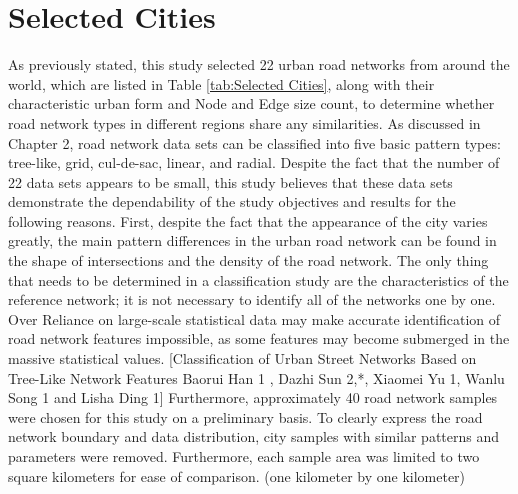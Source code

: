 \section{Selected Cities}
As previously stated, this study selected 22 urban road networks from around the world, which are listed in Table \ref{tab:Selected Cities}, along with their characteristic urban form and Node and Edge size count, to determine whether road network types in different regions share any similarities. As discussed in Chapter 2, road network data sets can be classified into five basic pattern types: tree-like, grid, cul-de-sac, linear, and radial. Despite the fact that the number of 22 data sets appears to be small, this study believes that these data sets demonstrate the dependability of the study objectives and results for the following reasons. First, despite the fact that the appearance of the city varies greatly, the main pattern differences in the urban road network can be found in the shape of intersections and the density of the road network. The only thing that needs to be determined in a classification study are the characteristics of the reference network; it is not necessary to identify all of the networks one by one. Over Reliance on large-scale statistical data may make accurate identification of road network features impossible, as some features may become submerged in the massive statistical values. [Classification of Urban Street Networks Based on Tree-Like Network Features Baorui Han 1 , Dazhi Sun 2,*, Xiaomei Yu 1, Wanlu Song 1 and Lisha Ding 1] Furthermore, approximately 40 road network samples were chosen for this study on a preliminary basis. To clearly express the road network boundary and data distribution, city samples with similar patterns and parameters were removed.
Furthermore, each sample area was limited to two square kilometers for ease of comparison. (one kilometer by one kilometer)


